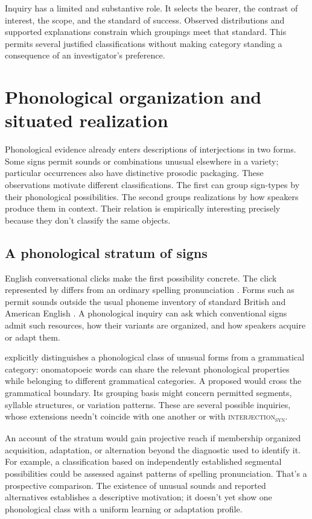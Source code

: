 \documentclass[12pt]{article}
\newcommand{\intj}[1]{\textsc{interjection\textsubscript{#1}}}
\begin{document}
Inquiry has a limited and substantive role. It selects
the bearer, the contrast of interest, the scope, and the standard of success.
Observed distributions and supported explanations constrain which groupings
meet that standard. This permits several justified classifications without
making category standing a consequence of an investigator's preference.

\section{Phonological organization and situated realization}\label{sec:phonology}

Phonological evidence already enters descriptions of interjections in two
forms. Some signs permit sounds or combinations unusual elsewhere in a
variety; particular occurrences also have distinctive prosodic packaging.
These observations motivate different classifications. The first can group
sign-types by their phonological possibilities. The second groups realizations
by how speakers produce them in context. Their relation is empirically
interesting precisely because they don't classify the same objects.

\subsection{A phonological stratum of signs}

English conversational clicks make the first possibility concrete. The
click represented by  differs from an ordinary spelling
pronunciation \citep[147]{wilkins1992}. Forms such as  permit
sounds outside the usual phoneme inventory of standard British and
American English \citep[853]{quirk1985}. A phonological inquiry can
ask which conventional signs admit such resources, how their variants are
organized, and how speakers acquire or adapt them.

\textcite[112--113]{ameka1992} explicitly distinguishes a phonological
class of unusual forms from
a grammatical category: onomatopoeic words can share the relevant phonological
properties while belonging to different grammatical categories. A proposed  would
cross the grammatical boundary. Its grouping basis might concern
permitted segments, syllable structures, or variation patterns. These are
several possible inquiries, whose extensions needn't coincide with one
another or with \intj{syn}.

An account of the stratum would gain projective reach if membership
organized acquisition, adaptation, or alternation beyond the diagnostic
used to identify it. For example, a classification based on independently
established segmental possibilities could be assessed against patterns of
spelling pronunciation. That's a prospective comparison. The existence
of unusual sounds and reported alternatives establishes a descriptive
motivation; it doesn't yet show one phonological class with a uniform
learning or adaptation profile.
\end{document}
